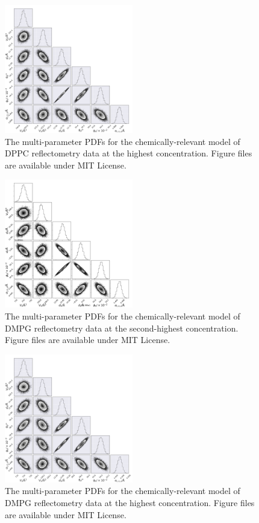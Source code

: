 \documentclass[11pt,a4paper]{article}
\begin{document}
\begin{figure}
	\centering
	\includegraphics[width=0.50\textwidth]{figures/dppc5_all_corner}
	\caption{The multi-parameter PDFs for the chemically-relevant model of DPPC reflectometry data at the highest concentration. Figure files are available under MIT License.\cite{mccluskey_2018}}
	\label{fig:dppc5}
\end{figure}
\begin{figure}
	\centering
	\includegraphics[width=0.50\textwidth]{figures/dmpg4_all_corner}
	\caption{The multi-parameter PDFs for the chemically-relevant model of DMPG reflectometry data at the second-highest concentration. Figure files are available under MIT License.\cite{mccluskey_2018}}
	\label{fig:dmpg4}
\end{figure}
\begin{figure}
	\centering
	\includegraphics[width=0.50\textwidth]{figures/dmpg5_all_corner}
	\caption{The multi-parameter PDFs for the chemically-relevant model of DMPG reflectometry data at the highest concentration. Figure files are available under MIT License.\cite{mccluskey_2018}}
	\label{fig:dmpg5}
\end{figure}

	
\end{document}
